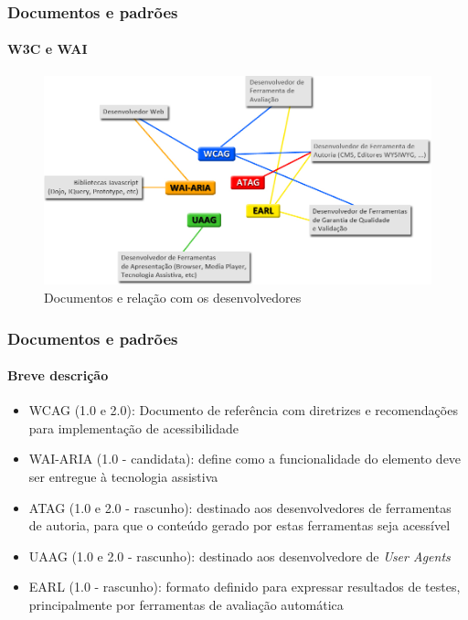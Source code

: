 \documentclass{beamer}
\begin{document}
\begin{frame}
\frametitle{Documentos e padrões}
\framesubtitle{W3C e WAI}

\begin{figure}[htbp] \centering
	\includegraphics[width=\textwidth]{./img/relation.jpg}
	\caption{Documentos e relação com os desenvolvedores}
	\label{fig:relation}
\end{figure}

\end{frame}

\begin{frame}
\frametitle{Documentos e padrões}
\framesubtitle{Breve descrição}

\begin{itemize}
  \item WCAG (1.0 e 2.0): Documento de referência com diretrizes e recomendações para implementação de acessibilidade
  \item WAI-ARIA (1.0 - candidata): define como a funcionalidade do elemento deve ser entregue à tecnologia assistiva
  \item ATAG (1.0 e 2.0 - rascunho): destinado aos desenvolvedores de ferramentas de autoria, para que o conteúdo gerado por estas ferramentas seja acessível
  \item UAAG (1.0 e 2.0 - rascunho): destinado aos desenvolvedore de \textit{User Agents}
  \item EARL (1.0 - rascunho): formato definido para expressar resultados de testes, principalmente por ferramentas de avaliação automática 
\end{itemize}

\end{frame}
\end{document}
